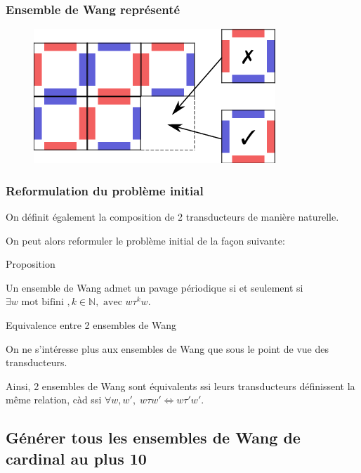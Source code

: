 \documentclass{beamer}
\newcommand{\N}{\mathbb N}
\begin{document}
\begin{frame}
\frametitle{Ensemble de Wang représenté}

\begin{figure}

    \includegraphics[scale = 0.5]{pavage_periodique}
    \centering
    
\end{figure}

\end{frame}

\begin{frame}
\frametitle{Reformulation du problème initial}

On définit également la composition de 2 transducteurs de manière naturelle.

On peut alors reformuler le problème initial de la façon suivante:

\begin{block}{Proposition}

Un ensemble de Wang admet un pavage périodique si et seulement si $\exists w \text{ mot bifini }, k \in \N, \text{ avec } w \tau^k w$.
    
\end{block}

\begin{block}{Equivalence entre 2 ensembles de Wang}

On ne s'intéresse plus aux ensembles de Wang que sous le point de vue des transducteurs.

Ainsi, 2 ensembles de Wang sont équivalents ssi leurs transducteurs définissent la même relation, càd ssi $\forall w,w', \; w \tau w' \iff w \tau' w'$.
    
\end{block}

\end{frame}

\subsection{Générer tous les ensembles de Wang de cardinal au plus 10}
\end{document}
